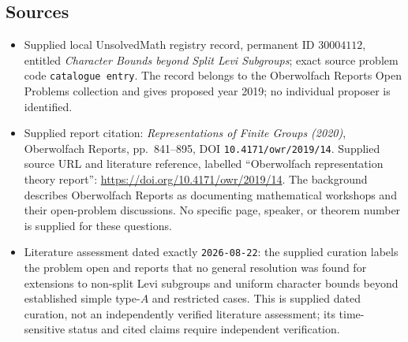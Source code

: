 \documentclass[11pt]{article}
\begin{document}
\subsection{Sources}
\begin{itemize}
\item Supplied local UnsolvedMath registry record, permanent ID \(30004112\), entitled \emph{Character Bounds beyond Split Levi Subgroups}; exact source problem code \texttt{catalogue entry}. The record belongs to the Oberwolfach Reports Open Problems collection and gives proposed year 2019; no individual proposer is identified.
\item Supplied report citation: \emph{Representations of Finite Groups (2020)}, Oberwolfach Reports, pp.~841--895, DOI \texttt{10.4171/owr/2019/14}. Supplied source URL and literature reference, labelled ``Oberwolfach representation theory report'': \url{https://doi.org/10.4171/owr/2019/14}. The background describes Oberwolfach Reports as documenting mathematical workshops and their open-problem discussions. No specific page, speaker, or theorem number is supplied for these questions.
\item Literature assessment dated exactly \texttt{2026-08-22}: the supplied curation labels the problem open and reports that no general resolution was found for extensions to non-split Levi subgroups and uniform character bounds beyond established simple type-\(A\) and restricted cases. This is supplied dated curation, not an independently verified literature assessment; its time-sensitive status and cited claims require independent verification.
\end{itemize}
\end{document}
